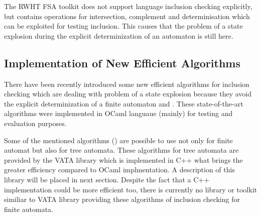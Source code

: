The RWHT FSA toolkit does not support language inclusion checking explicitly, but contains operations for intersection, complement and
determinisation which can be exploited for testing inclusion. This causes that the problem of a state explosion during 
the explicit determinization of an automaton is still here. 

\subsection{Implementation of New Efficient Algorithms}
There have been recently introduced some new efficient algorithms for inclusion checking 
which are dealing with problem of a state explosion because they avoid the explicit determinization of a finite automaton \cite{cav06,tacas10} and \cite{popl13}.
These state-of-the-art algorithms were implemented in OCaml languaue (mainly) for testing and evaluation purposes.

Some of the mentioned algorithms (\cite{cav06,taca10}) are possible to use not only for finite automat but also for tree automata. 
These algorithms for tree automata are provided by the VATA library which is implemented in C++ what brings the greater efficiency compared to OCaml implmentation. 
A description of this library will be placed in next section.
Despite the fact that a C++ implementation could be more efficient too, there is currently no library or toolkit similiar to VATA library providing 
these algorithms of inclusion checking for finite automata.

